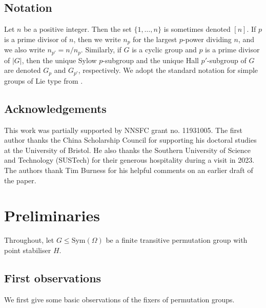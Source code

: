 \documentclass[twoside,a4paper,reqno,11pt]{amsart}
\newcommand{\<}{\langle}
\renewcommand{\>}{\rangle}
\newcommand{\leqs}{\leqslant}
\theoremstyle{definition}
\begin{document}
	
	
	
	
	
	
	
	\subsection*{Notation}
	
	Let $n$ be a positive integer. Then the set $\{1,\dots,n\}$ is sometimes denoted $[n]$. If $p$ is a prime divisor of $n$, then we write $n_p$ for the largest $p$-power dividing $n$, and we also write $n_{p'} = n/n_p$. Similarly, if $G$ is a cyclic group and $p$ is a prime divisor of $|G|$, then the unique Sylow $p$-subgroup and the unique Hall $p'$-subgroup of $G$ are denoted $G_p$ and $G_{p'}$, respectively.
	We adopt the standard notation for simple groups of Lie type from \cite{KL_classical}.
	
	
	
	
	
	
	\subsection*{Acknowledgements}
	
	This work was partially supported by NNSFC grant no. 11931005. The first author thanks the China Scholarship Council for supporting his doctoral studies at the University of Bristol. He also thanks the Southern
	University of Science and Technology (SUSTech) for their generous hospitality during a
	visit in 2023. The authors thank Tim Burness for his helpful comments on an earlier draft of the paper.
	
	
	\section{Preliminaries}
	
	\label{s:pre}
	
	Throughout, let $G\leqs\mathrm{Sym}(\Omega)$ be a finite transitive permutation group with point stabiliser $H$.
	
	\subsection{First observations}
	
	\label{ss:pre_obs}
	
	We first give some basic observations of the fixers of permutation groups.
	
\end{document}
